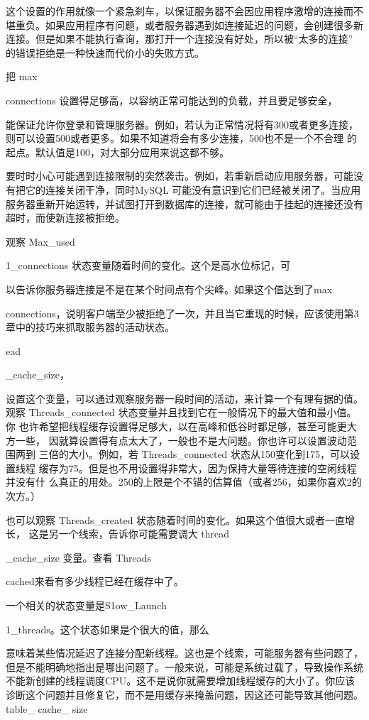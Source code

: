 这个设置的作用就像一个紧急刹车，以保证服务器不会因应用程序激增的连接而不
堪重负。如果应用程序有问题，或者服务器遇到如连接延迟的问题，会创建很多新
连接。但是如果不能执行查询，那打开一个连接没有好处，所以被“太多的连接”
的错误拒绝是一种快速而代价小的失败方式。

把 max

connections 设置得足够高，以容纳正常可能达到的负载，并且要足够安全，

能保证允许你登录和管理服务器。例如，若认为正常情况将有300或者更多连接，
则可以设置500或者更多。如果不知道将会有多少连接，500也不是一个不合理
的起点。默认值是100，对大部分应用来说这都不够。

要时时小心可能遇到连接限制的突然袭击。例如，若重新启动应用服务器，可能没
有把它的连接关闭干净，同时MySQL 可能没有意识到它们已经被关闭了。当应用
服务器重新开始运转，并试图打开到数据库的连接，就可能由于挂起的连接还没有
超时，而使新连接被拒绝。

观察 Max\_used

1\_connections 状态变量随着时间的变化。这个是高水位标记，可

以告诉你服务器连接是不是在某个时间点有个尖峰。如果这个值达到了max

connections，说明客户端至少被拒绝了一次，并且当它重现的时候，应该使用第3
章中的技巧来抓取服务器的活动状态。

ead

\_cache\_size，

设置这个变量，可以通过观察服务器一段时间的活动，来计算一个有理有据的值。
观察 Threads\_connected 状态变量并且找到它在一般情况下的最大值和最小值。你
也许希望把线程缓存设置得足够大，以在高峰和低谷时都足够，甚至可能更大方一些，
因就算设置得有点太大了，一般也不是大问题。你也许可以设置波动范围两到
三倍的大小。例如，若 Threads\_connected 状态从150变化到175，可以设置线程
缓存为75。但是也不用设置得非常大，因为保持大量等待连接的空闲线程并没有什
么真正的用处。250的上限是个不错的估算值（或者256，如果你喜欢2的次方。）

也可以观察 Threads\_created 状态随着时间的变化。如果这个值很大或者一直增长，
这是另一个线索，告诉你可能需要调大 thread

\_cache\_size 变量。查看 Threads

cached来看有多少线程已经在缓存中了。

一个相关的状态变量是S1ow\_Launch

1\_threads。这个状态如果是个很大的值，那么

意味着某些情况延迟了连接分配新线程。这也是个线索，可能服务器有些问题了，
但是不能明确地指出是哪出问题了。一般来说，可能是系统过载了，导致操作系统
不能新创建的线程调度CPU。这不是说你就需要增加线程缓存的大小了。你应该
诊断这个问题并且修复它，而不是用缓存来掩盖问题，因这还可能导致其他问题。
table\_ cache\_ size


